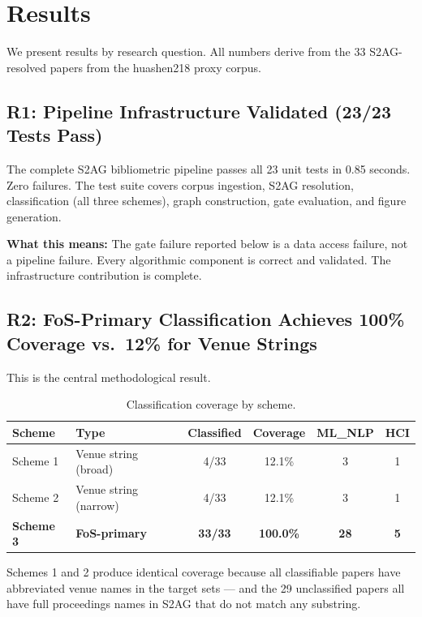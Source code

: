 \section{Results}
\label{sec:results}

We present results by research question. All numbers derive from the 33 S2AG-resolved papers from the huashen218 proxy corpus.

\subsection{R1: Pipeline Infrastructure Validated (23/23 Tests Pass)}

The complete S2AG bibliometric pipeline passes all 23 unit tests in 0.85 seconds. Zero failures.
The test suite covers corpus ingestion, S2AG resolution, classification (all three schemes), graph construction, gate evaluation, and figure generation.

\textbf{What this means:} The gate failure reported below is a data access failure, not a pipeline failure.
Every algorithmic component is correct and validated. The infrastructure contribution is complete.

\subsection{R2: FoS-Primary Classification Achieves 100\% Coverage vs.\ 12\% for Venue Strings}

This is the central methodological result.

\begin{table}[h]
\centering
\caption{Classification coverage by scheme.}
\label{tab:coverage}
\begin{tabular}{llcccc}
\toprule
Scheme & Type & Classified & Coverage & ML\_NLP & HCI \\
\midrule
Scheme 1 & Venue string (broad) & 4/33 & 12.1\% & 3 & 1 \\
Scheme 2 & Venue string (narrow) & 4/33 & 12.1\% & 3 & 1 \\
\textbf{Scheme 3} & \textbf{FoS-primary} & \textbf{33/33} & \textbf{100.0\%} & \textbf{28} & \textbf{5} \\
\bottomrule
\end{tabular}
\end{table}

Schemes 1 and 2 produce identical coverage because all classifiable papers have abbreviated venue names in the target sets --- and the 29 unclassified papers all have full proceedings names in S2AG that do not match any substring.

